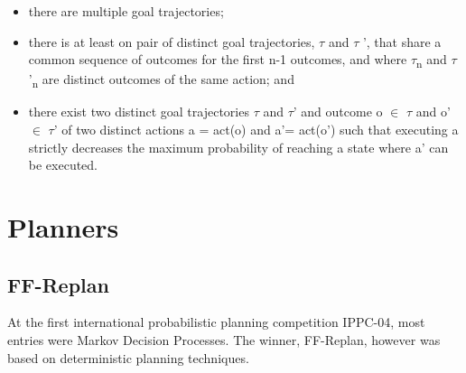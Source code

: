 \documentclass[runningheads,a4paper]{llncs}
\begin{document}
\begin{itemize}
	\item there are multiple goal trajectories;
	\item there is at least on pair of distinct goal trajectories, $\tau$ and $\tau$ ', that share a common sequence of outcomes for the first n-1 outcomes, and where $\tau$\textsubscript{n} and $\tau$'\textsubscript{n} are distinct outcomes of the same action; and
	\item there exist two distinct goal trajectories $\tau$ and $\tau$' and outcome o $\in$ $\tau$ and o' $\in$ $\tau$' of two distinct actions a = act(o) and a'= act(o') such that executing a strictly decreases the maximum probability of reaching a state where a' can be executed.
\end{itemize}

%



\section{Planners}
\label{sec:planners}

\subsection{FF-Replan}

At the first international probabilistic planning competition IPPC-04, most entries were Markov Decision Processes. The winner, FF-Replan, however was based on deterministic planning techniques.
\end{document}
